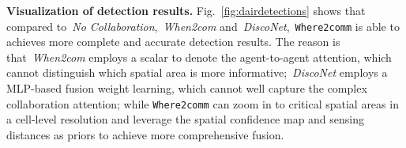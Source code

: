 \textbf{Visualization of detection results.} Fig.~\ref{fig:dairdetections} shows that compared to~\textit{No Collaboration},~\textit{When2com} and~\textit{DiscoNet},~\texttt{Where2comm} is able to achieves more complete and accurate detection results. The reason is that~\textit{When2com} employs a scalar to denote the agent-to-agent attention, which cannot distinguish which spatial area is more informative;~\textit{DiscoNet} employs a MLP-based fusion weight learning, which cannot well capture the complex collaboration attention; while \texttt{Where2comm} can zoom in to critical spatial areas in a cell-level resolution and leverage  the spatial confidence map and sensing distances as priors to achieve more comprehensive fusion.




